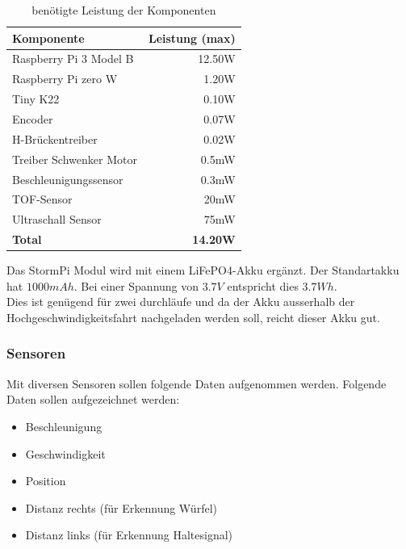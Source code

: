 \documentclass[../../main.tex]{subfiles}
\begin{document}
    \begin{table}[H] \centering
        \begin{tabular}{|l|r|}
        \hline
        \textbf{Komponente}     & \textbf{Leistung (max)} \\ \hline
        Raspberry Pi 3 Model B  & 12.50W \nocite{PiShopPi3ModelBp}                 \\ \hline
        Raspberry Pi zero W     & 1.20W \nocite{RaspiTvPiZeroPower}                   \\ \hline
        Tiny K22                & 0.10W \nocite{K22DataSheet}       \\ \hline
        Encoder                 & 0.07W                   \\ \hline
        H-Brückentreiber        & 0.02W                   \\ \hline
        Treiber Schwenker Motor & 0.5mW                   \\ \hline
        Beschleunigungssensor   & 0.3mW                   \\ \hline
        TOF-Sensor              & 20mW                    \\ \hline
        Ultraschall Sensor      & 75mW                    \\ \hline
        \textbf{Total}          & \textbf{14.20W}         \\ \hline
        \end{tabular}
        \caption{benötigte Leistung der Komponenten}
        \label{tab:et_komponente_leistung}
    \end{table}

    Das StormPi Modul wird mit einem LiFePO4-Akku ergänzt. Der Standartakku hat $1000mAh$. Bei einer Spannung von $3.7V$ entspricht dies $3.7Wh$. \\
    Dies ist genügend für zwei durchläufe und da der Akku ausserhalb der Hochgeschwindigkeitsfahrt nachgeladen werden soll, reicht dieser Akku gut.

    \subsubsection{Sensoren}
    Mit diversen Sensoren sollen folgende Daten aufgenommen werden. Folgende Daten sollen aufgezeichnet werden:
    \begin{itemize}
        \item Beschleunigung
        \item Geschwindigkeit
        \item Position
        \item Distanz rechts (für Erkennung Würfel)
        \item Distanz links (für Erkennung Haltesignal)
    \end{itemize}
\end{document}
